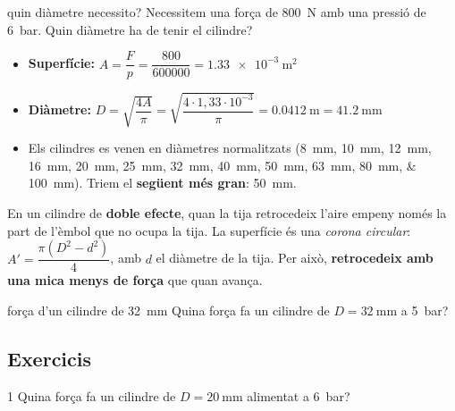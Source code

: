 \begin{exemple}{quin diàmetre necessito?}
Necessitem una força de \SI{800}{\newton} amb una pressió de \SI{6}{\bar}. Quin diàmetre ha de tenir el cilindre?
\begin{itemize}
 \item \textbf{Superfície:} $A = \dfrac{F}{p} = \dfrac{800}{600000} = \SI{1,33e-3}{\meter\squared}$
 \item \textbf{Diàmetre:} $D = \sqrt{\dfrac{4A}{\pi}} = \sqrt{\dfrac{4\cdot1{,}33\cdot10^{-3}}{\pi}} = \SI{0,0412}{\meter} = \SI{41,2}{\milli\meter}$
 \item Els cilindres es venen en diàmetres normalitzats (\SIlist{8;10;12;16;20;25;32;40;50;63;80;100}{\milli\meter}). Triem el \textbf{següent més gran}: \SI{50}{\milli\meter}.
\end{itemize}
\end{exemple}

\begin{sabiesque}
En un cilindre de \textbf{doble efecte}, quan la tija retrocedeix l'aire empeny només la part de l'èmbol que no ocupa la tija. La superfície és una \emph{corona circular}: $A' = \dfrac{\pi (D^2 - d^2)}{4}$, amb $d$ el diàmetre de la tija. Per això, \textbf{retrocedeix amb una mica menys de força} que quan avança.
\end{sabiesque}

\begin{guiada}{força d'un cilindre de \SI{32}{\milli\meter}}
Quina força fa un cilindre de $D = \SI{32}{\milli\meter}$ a \SI{5}{\bar}?
\end{guiada}

\subsection*{Exercicis}

\begin{exercici}{1}
Quina força fa un cilindre de $D = \SI{20}{\milli\meter}$ alimentat a \SI{6}{\bar}?
\end{exercici}

